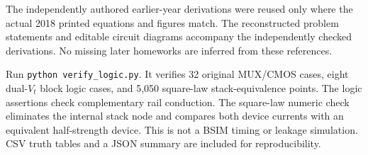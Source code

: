 \documentclass[11pt]{article}
\begin{document}
The independently authored earlier-year derivations were reused only where
the actual 2018 printed equations and figures match. The reconstructed problem statements and editable circuit diagrams
accompany the independently checked derivations. No missing later
homeworks are inferred from these references.

Run \texttt{python verify\_logic.py}. It verifies 32 original MUX/CMOS cases,
eight dual-$V_t$ block logic cases, and 5,050 square-law stack-equivalence
points. The logic assertions check complementary rail conduction. The
square-law numeric check eliminates the internal stack node and compares
both device currents with an equivalent half-strength device. This is not
a BSIM timing or leakage simulation. CSV truth tables and a JSON summary
are included for reproducibility.
\end{document}
